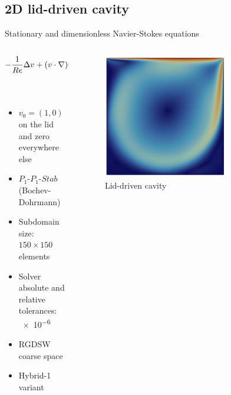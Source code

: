 \subsection{2D lid-driven cavity}

\begin{frame}{Stationary and dimensionless Navier-Stokes equations}
  \vspace{-5mm}
	\begin{columns}
		\begin{column}{0.6\textwidth}%
			\begin{align*}
				-\frac{1}{Re} \Delta v + (v \cdot \nabla)v + \nabla p & = 0 \;   & {\rm in}\; \Omega           \\
				{\rm div}(v)                                          & = 0 \;   & {\rm in} \; \Omega          \\
				v                                                     & = v_0 \; & {\rm on} \; \partial \Omega
			\end{align*}
  \vspace{-4mm}
			\begin{itemize}
				\item $v_0=(1,0)$ on the lid and zero everywhere else
        \item $P_1\textrm{-}P_1\textrm{-}Stab$ (Bochev-Dohrmann) \footnotemark{}
				\item Subdomain size: $150\times 150$ elements
				\item Solver absolute and relative tolerances: \num{e-6}
        \item RGDSW coarse space \footnotemark{}
				\item Hybrid-1 variant
			\end{itemize}
		\end{column}
		\begin{column}{0.4\textwidth}
			\begin{figure}
				\centering
				\includegraphics[width=0.7\textwidth]{images/ldc.png}
				\caption{Lid-driven cavity}
			\end{figure}
		\end{column}
	\end{columns}
\end{frame}

